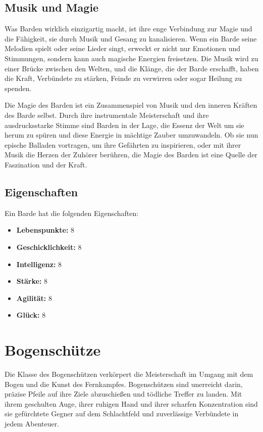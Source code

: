 \documentclass[letterpaper,twocolumn,openany,nodeprecatedcode]{dndbook}
\begin{document}
\subsection{Musik und Magie}
Was Barden wirklich einzigartig macht, ist ihre enge Verbindung zur Magie und die Fähigkeit, sie durch Musik und Gesang zu kanalisieren. Wenn ein Barde seine Melodien spielt oder seine Lieder singt, erweckt er nicht nur Emotionen und Stimmungen, sondern kann auch magische Energien freisetzen. Die Musik wird zu einer Brücke zwischen den Welten, und die Klänge, die der Barde erschafft, haben die Kraft, Verbündete zu stärken, Feinde zu verwirren oder sogar Heilung zu spenden.

Die Magie des Barden ist ein Zusammenspiel von Musik und den inneren Kräften des Barde selbst. Durch ihre instrumentale Meisterschaft und ihre ausdrucksstarke Stimme sind Barden in der Lage, die Essenz der Welt um sie herum zu spüren und diese Energie in mächtige Zauber umzuwandeln. Ob sie nun epische Balladen vortragen, um ihre Gefährten zu inspirieren, oder mit ihrer Musik die Herzen der Zuhörer berühren, die Magie des Barden ist eine Quelle der Faszination und der Kraft.

\subsection{Eigenschaften}
Ein Barde hat die folgenden Eigenschaften:

\begin{itemize}
    \item \textbf{Lebenspunkte:} 8 
    \item \textbf{Geschicklichkeit:} 8 
    \item \textbf{Intelligenz:} 8 
    \item \textbf{Stärke:} 8 
    \item \textbf{Agilität:} 8 
    \item \textbf{Glück:} 8
\end{itemize}

\section{Bogenschütze}
Die Klasse des Bogenschützen verkörpert die Meisterschaft im Umgang mit dem Bogen und die Kunst des Fernkampfes. Bogenschützen sind unerreicht darin, präzise Pfeile auf ihre Ziele abzuschießen und tödliche Treffer zu landen. Mit ihrem geschulten Auge, ihrer ruhigen Hand und ihrer scharfen Konzentration sind sie gefürchtete Gegner auf dem Schlachtfeld und zuverlässige Verbündete in jedem Abenteuer.
\end{document}
